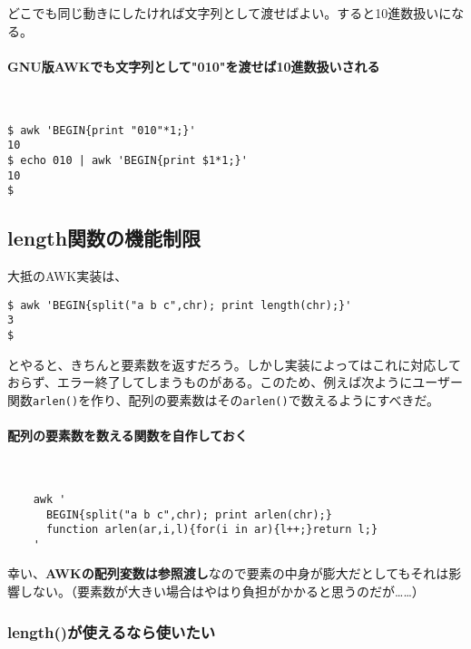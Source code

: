 どこでも同じ動きにしたければ文字列として渡せばよい。すると10進数扱いになる。

\paragraph{GNU版AWKでも文字列として"010"を渡せば10進数扱いされる} 　\\
\begin{screen}
	\verb|$ awk 'BEGIN{print "010"*1;}'| \return \\
	\verb|10| \\
	\verb!$ echo 010 | awk 'BEGIN{print $1*1;}'! \return \\
	\verb|10| \\
	\verb|$ |
\end{screen}

\subsection*{length関数の機能制限}

大抵のAWK実装は、

\begin{screen}
	\verb|$ awk 'BEGIN{split("a b c",chr); print length(chr);}'| \return \\
	\verb|3| \\
	\verb|$ |
\end{screen}

とやると、きちんと要素数を返すだろう。しかし実装によってはこれに対応しておらず、エラー終了してしまうものがある。このため、例えば次ようにユーザー関数\verb|arlen()|を作り、配列の要素数はその\verb|arlen()|で数えるようにすべきだ。

\paragraph{配列の要素数を数える関数を自作しておく} 　\\
\begin{frameboxit}{160.0mm}
\begin{verbatim}
	awk '
	  BEGIN{split("a b c",chr); print arlen(chr);}
	  function arlen(ar,i,l){for(i in ar){l++;}return l;}
	'
\end{verbatim}
\end{frameboxit}

幸い、\textbf{AWKの配列変数は参照渡し}なので要素の中身が膨大だとしてもそれは影響しない。（要素数が大きい場合はやはり負担がかかると思うのだが……）

\subsubsection*{length()が使えるなら使いたい}

